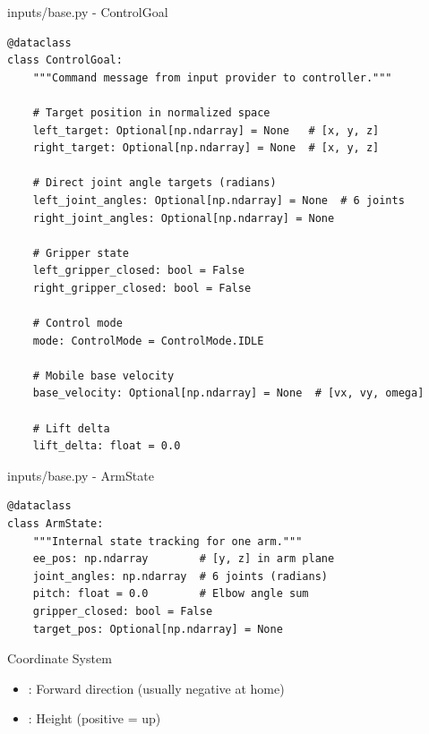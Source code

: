 \begin{frame}[fragile]{inputs/base.py - ControlGoal}
\begin{lstlisting}
@dataclass
class ControlGoal:
    """Command message from input provider to controller."""

    # Target position in normalized space
    left_target: Optional[np.ndarray] = None   # [x, y, z]
    right_target: Optional[np.ndarray] = None  # [x, y, z]

    # Direct joint angle targets (radians)
    left_joint_angles: Optional[np.ndarray] = None  # 6 joints
    right_joint_angles: Optional[np.ndarray] = None

    # Gripper state
    left_gripper_closed: bool = False
    right_gripper_closed: bool = False

    # Control mode
    mode: ControlMode = ControlMode.IDLE

    # Mobile base velocity
    base_velocity: Optional[np.ndarray] = None  # [vx, vy, omega]

    # Lift delta
    lift_delta: float = 0.0
\end{lstlisting}
\end{frame}

\begin{frame}[fragile]{inputs/base.py - ArmState}
\begin{lstlisting}[basicstyle=\ttfamily\scriptsize]
@dataclass
class ArmState:
    """Internal state tracking for one arm."""
    ee_pos: np.ndarray        # [y, z] in arm plane
    joint_angles: np.ndarray  # 6 joints (radians)
    pitch: float = 0.0        # Elbow angle sum
    gripper_closed: bool = False
    target_pos: Optional[np.ndarray] = None
\end{lstlisting}

\vspace{0.2cm}

\begin{block}{Coordinate System}
\begin{itemize}
    \item {}: Forward direction (usually negative at home)
    \item {}: Height (positive = up)
\end{itemize}
\end{block}
\end{frame}

